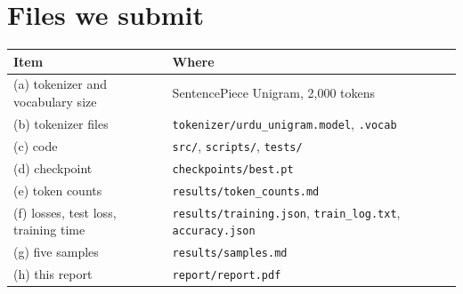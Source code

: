 \documentclass[11pt,a4paper]{article}
\begin{document}
\appendix
\section{Files we submit}

\begin{tabular}{ll}
\toprule
Item & Where \\
\midrule
(a) tokenizer and vocabulary size & SentencePiece Unigram, 2{,}000 tokens \\
(b) tokenizer files & \texttt{tokenizer/urdu\_unigram.model}, \texttt{.vocab} \\
(c) code & \texttt{src/}, \texttt{scripts/}, \texttt{tests/} \\
(d) checkpoint & \texttt{checkpoints/best.pt} \\
(e) token counts & \texttt{results/token\_counts.md} \\
(f) losses, test loss, training time & \texttt{results/training.json}, \texttt{train\_log.txt}, \texttt{accuracy.json} \\
(g) five samples & \texttt{results/samples.md} \\
(h) this report & \texttt{report/report.pdf} \\
\bottomrule
\end{tabular}
\end{document}
